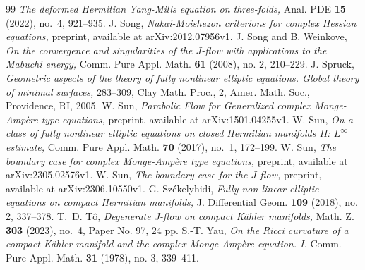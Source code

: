 \documentclass{amsart}
\numberwithin{equation}{section}
\theoremstyle{plain}
\theoremstyle{definition}
\theoremstyle{remark}
\begin{document}
\begin{thebibliography}{99}
  \textit{The deformed Hermitian Yang-Mills equation on three-folds,} Anal. PDE {\bf 15} (2022), no.~4, 921--935.
  J. Song,
  \textit{Nakai-Moishezon criterions for complex Hessian equations,}
  preprint, available at arXiv:2012.07956v1.
  J. Song and B. Weinkove, 
  \textit{On the convergence and singularities of the $J$-flow with applications to the Mabuchi energy,} 
  Comm. Pure Appl. Math. \textbf{61} (2008), no. 2, 210--229. 
  J. Spruck, 
  \textit{Geometric aspects of the theory of fully nonlinear elliptic equations. Global theory of minimal surfaces,}
  283--309, Clay Math. Proc., 2, Amer. Math. Soc., Providence, RI, 2005.
  W. Sun,
  \textit{Parabolic Flow for Generalized complex Monge-Ampère type equations,}
  preprint, available at arXiv:1501.04255v1.
  W. Sun, 
  \textit{On a class of fully nonlinear elliptic equations on closed Hermitian manifolds II: $L^\infty$ estimate,} 
  Comm. Pure Appl. Math. {\bf 70} (2017), no.~1, 172--199.
  W. Sun,
  \textit{The boundary case for complex Monge-Ampère type equations,}
  preprint, available at arXiv:2305.02576v1.
  W. Sun,
  \textit{The boundary case for the $J$-flow,}
  preprint, available at arXiv:2306.10550v1. 
  G. Sz{\'e}kelyhidi, 
  \textit{Fully non-linear elliptic equations on compact Hermitian manifolds,} 
  J. Differential Geom. \textbf{109} (2018), no. 2, 337--378. 
  T.~D. T\^o, 
  \textit{Degenerate J-flow on compact K\"ahler manifolds,} 
  Math. Z. {\bf 303} (2023), no.~4, Paper No. 97, 24 pp.
  S.-T. Yau, 
  \textit{On the Ricci curvature of a compact Kähler manifold and the complex Monge-Ampère equation. I.} 
  Comm. Pure Appl. Math. \textbf{31} (1978), no. 3, 339--411.
\end{thebibliography}
\end{document}
